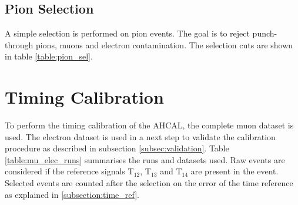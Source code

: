 \subsection{Pion Selection}
A simple selection is performed on pion events. The goal is to reject punch-through pions, muons and electron contamination. The selection cuts are shown in table \ref{table:pion_sel}.

\begin{table}[t]
	\centering
	\caption{Selection cuts for pions.}
	\label{table:pion_sel}
\end{table}

\section{Timing Calibration}

To perform the timing calibration of the AHCAL, the complete muon dataset is used. The electron dataset is used in a next step to validate the calibration procedure as described in subsection \ref{subsec:validation}. Table \ref{table:mu_elec_runs} summarises the runs and datasets used. Raw events are considered if the reference signals T$_{12}$,  T$_{13}$ and T$_{14}$ are present in the event. Selected events are counted after the selection on the error of the time reference as explained in \ref{subsection:time_ref}.

